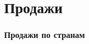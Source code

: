 \section{Продажи}

\begin{frame}
    \frametitle{Продажи по странам}
    \begin{center}
    
    \end{center}
\end{frame}